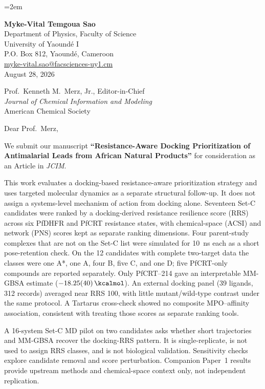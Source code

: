 \documentclass[11pt,letterpaper]{article}
\begin{document}
\emergencystretch=2em

\begin{flushleft}
\textbf{Myke-Vital Temgoua Sao} \\
Department of Physics, Faculty of Science \\
University of Yaound\'{e} I \\
P.O. Box 812, Yaound\'{e}, Cameroon \\
\href{mailto:myke-vital.sao@facsciences-uy1.cm}{myke-vital.sao@facsciences-uy1.cm} \\[1.5em]
August 28, 2026
\end{flushleft}

\begin{flushleft}
Prof.\ Kenneth M.\ Merz, Jr., Editor-in-Chief \\
\textit{Journal of Chemical Information and Modeling} \\
American Chemical Society
\end{flushleft}

\vspace{0.5em}

\noindent Dear Prof.\ Merz,

We submit our manuscript \textbf{``Resistance-Aware Docking Prioritization of Antimalarial Leads from African Natural Products''} for consideration as an Article in \textit{JCIM}.

This work evaluates a docking-based resistance-aware prioritization strategy and uses targeted molecular dynamics as a separate structural follow-up. It does not assign a systems-level mechanism of action from docking alone. Seventeen Set-C candidates were ranked by a docking-derived resistance resilience score (RRS) across six PfDHFR and PfCRT resistance states, with chemical-space (ACSI) and network (PNS) scores kept as separate ranking dimensions. Four parent-study complexes that are not on the Set-C list were simulated for \qty{10}{\nano\second} each as a short pose-retention check. On the 12 candidates with complete two-target data the classes were one A*, one A, four B, five C, and one D; five PfCRT-only compounds are reported separately. Only PfCRT--214 gave an interpretable MM-GBSA estimate ($\qty{-18.25 \pm 0.40}{\kcalmol}$). An external docking panel (39 ligands, 312 records) averaged near RRS 100, with little mutant/wild-type contrast under the same protocol. A Tartarus cross-check showed no composite MPO--affinity association, consistent with treating those scores as separate ranking tools.

A 16-system Set-C MD pilot on two candidates asks whether short trajectories and MM-GBSA recover the docking-RRS pattern. It is single-replicate, is not used to assign RRS classes, and is not biological validation. Sensitivity checks explore candidate removal and score perturbation. Companion Paper~1 results provide upstream methods and chemical-space context only, not independent replication.
\end{document}
